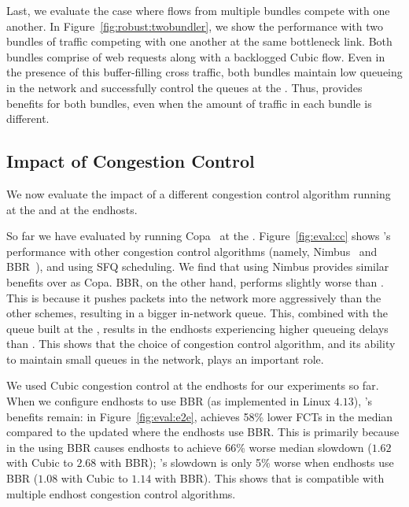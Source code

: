 
 Last, we evaluate the case where flows from multiple bundles compete with one another. 
In Figure~\ref{fig:robust:twobundler}, we show the performance with two bundles of traffic competing with one another at the same bottleneck link. 
Both bundles comprise of web requests along with a backlogged Cubic flow. 
Even in the presence of this buffer-filling cross traffic, both bundles maintain low queueing in the network and successfully control the queues at the \inbox.
Thus, \name provides benefits for both bundles, even when the amount of traffic in each bundle is different.  

\subsection{Impact of Congestion Control} \label{s:eval:cc}

We now evaluate the impact of a different congestion control algorithm running at the \inbox and at the endhosts.



 So far we have evaluated \name by running Copa~\cite{copa} at the \inbox.  
Figure~\ref{fig:eval:cc} shows \name's performance with other congestion control algorithms (namely, Nimbus~\cite{nimbus} and BBR~\cite{bbr}), and using SFQ scheduling. 
We find that using Nimbus provides similar benefits over \baseline as Copa. 
BBR, on the other hand, performs slightly worse than \baseline. 
This is because it pushes packets into the network more aggressively than the other schemes, resulting in a bigger in-network queue.
This, combined with the queue built at the \name, results in the endhosts experiencing higher queueing delays than \baseline. This shows that the choice of congestion control algorithm, and its ability to maintain small queues in the network, plays an important role. 


We used Cubic congestion control at the endhosts for our experiments so far. When we configure endhosts to use BBR (as implemented in Linux $4.13$), \name's benefits remain: in Figure~\ref{fig:eval:e2e}, \name achieves 58\% lower FCTs in the median compared to the updated \baseline where the endhosts use BBR. 
This is primarily because in the \baseline using BBR causes endhosts to achieve 66\% worse median slowdown ($1.62$ with Cubic to $2.68$ with BBR); \name's slowdown is only 5\% worse when endhosts use BBR ($1.08$ with Cubic to $1.14$ with BBR). 
This shows that \name is compatible with multiple endhost congestion control algorithms.
